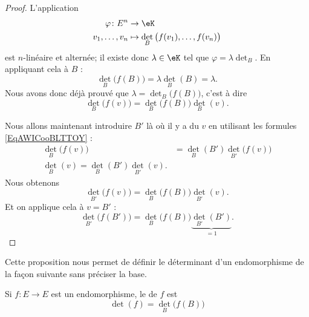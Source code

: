 \begin{proof}
    L'application
    \begin{equation}
        \begin{aligned}
            \varphi\colon E^n&\to \eK \\
            v_1,\ldots, v_n&\mapsto \det_B\big( f(v_1),\ldots, f(v_n) \big) 
        \end{aligned}
    \end{equation}
    est \( n\)-linéaire et alternée; il existe donc \( \lambda\in \eK\) tel que \( \varphi=\lambda\det_B\). En appliquant cela à \( B\) :
    \begin{equation}
        \det_B\big( f(B) \big)=\lambda \det_B(B)=\lambda.
    \end{equation}
    Nous avons donc déjà prouvé que \( \lambda=\det_B\big( f(B) \big)\), c'est à dire
    \begin{equation}
        \det_B\big( f(v) \big)=\det_B\big( f(B) \big)\det_B(v).
    \end{equation}
    
    Nous allons maintenant introduire \( B'\) là où il y a du \( v\) en utilisant les formules \eqref{EqAWICooBLTTOY} :
    \begin{subequations}
        \begin{align}
            \det_B\big( f(v) \big)&=\det_B(B')\det_{B'}\big( f(v) \big)\\
            \det_B(v)=\det_B(B')\det_{B'}(v).
        \end{align}
    \end{subequations}
    Nous obtenons
    \begin{equation}
        \det_{B'}\big( f(v) \big)=\det_B\big( f(B) \big)\det_{B'}(v).
    \end{equation}
    Et on applique cela à \( v=B'\) :
    \begin{equation}
        \det_{B'}\big( f(B') \big)=\det_B\big( f(B) \big)\underbrace{\det_{B'}(B')}_{=1}.
    \end{equation}
\end{proof}

Cette proposition nous permet de définir le déterminant d'un endomorphisme de la façon suivante sans préciser la base.
\begin{definition}
    Si \( f\colon E\to E\) est un endomorphisme, le  de \( f\) est
    \begin{equation}
        \det(f)=\det_B\big( f(B) \big)
    \end{equation}
\end{definition}

